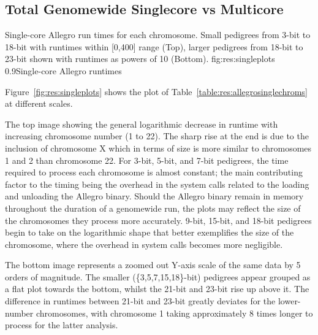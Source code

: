 \subsection{Total Genomewide Singlecore vs Multicore}

	{Single-core Allegro run times for each chromosome. Small pedigrees from 3-bit to 18-bit with runtimes within [0,400] range (Top), larger pedigrees from 18-bit to 23-bit shown with runtimes as powers of 10 (Bottom).}
	{fig:res:singleplots}
	{0.9}{Single-core Allegro runtimes}

Figure~\ref{fig:res:singleplots} shows the plot of Table~\ref{table:res:allegrosinglechroms} at different scales. 

The top image showing the general logarithmic decrease in runtime with increasing chromosome number (1 to 22). The sharp rise at the end is due to the inclusion of chromosome X which in terms of size is more similar to chromosomes 1 and 2 than chromosome 22. For 3-bit, 5-bit, and 7-bit pedigrees, the time required to process each chromosome is almost constant; the main contributing factor to the timing being the overhead in the system calls related to the loading and unloading the Allegro binary. Should the Allegro binary remain in memory throughout the duration of a genomewide run, the plots may reflect the size of the chromosomes they process more accurately. 9-bit, 15-bit, and 18-bit pedigrees begin to take on the logarithmic shape that better exemplifies the size of the chromosome, where the overhead in system calls becomes more negligible.

The bottom image represents a zoomed out Y-axis scale of the same data by 5 orders of magnitude. The smaller (\{3,5,7,15,18\}-bit) pedigrees appear grouped as a flat plot towards the bottom, whilst the 21-bit and 23-bit rise up above it. The difference in runtimes between 21-bit and 23-bit greatly deviates for the lower-number chromosomes, with chromosome 1 taking approximately 8 times longer to process for the latter analysis.


